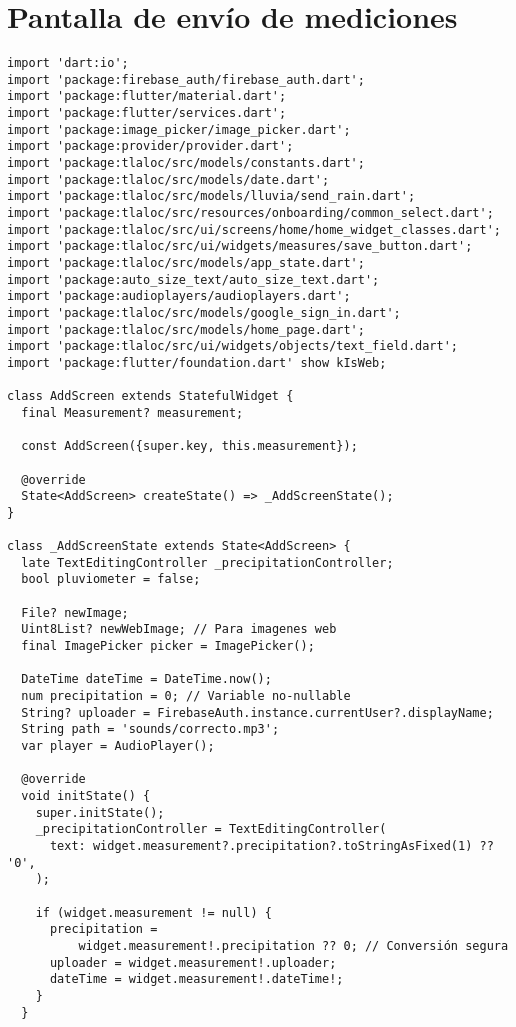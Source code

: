 




\section{Pantalla de envío de mediciones}
\label{anexo:alg13}
\begin{verbatim} 
import 'dart:io';
import 'package:firebase_auth/firebase_auth.dart';
import 'package:flutter/material.dart';
import 'package:flutter/services.dart';
import 'package:image_picker/image_picker.dart';
import 'package:provider/provider.dart';
import 'package:tlaloc/src/models/constants.dart';
import 'package:tlaloc/src/models/date.dart';
import 'package:tlaloc/src/models/lluvia/send_rain.dart';
import 'package:tlaloc/src/resources/onboarding/common_select.dart';
import 'package:tlaloc/src/ui/screens/home/home_widget_classes.dart';
import 'package:tlaloc/src/ui/widgets/measures/save_button.dart';
import 'package:tlaloc/src/models/app_state.dart';
import 'package:auto_size_text/auto_size_text.dart';
import 'package:audioplayers/audioplayers.dart';
import 'package:tlaloc/src/models/google_sign_in.dart';
import 'package:tlaloc/src/models/home_page.dart';
import 'package:tlaloc/src/ui/widgets/objects/text_field.dart';
import 'package:flutter/foundation.dart' show kIsWeb;

class AddScreen extends StatefulWidget {
  final Measurement? measurement;

  const AddScreen({super.key, this.measurement});

  @override
  State<AddScreen> createState() => _AddScreenState();
}

class _AddScreenState extends State<AddScreen> {
  late TextEditingController _precipitationController;
  bool pluviometer = false;

  File? newImage;
  Uint8List? newWebImage; // Para imagenes web
  final ImagePicker picker = ImagePicker();

  DateTime dateTime = DateTime.now();
  num precipitation = 0; // Variable no-nullable
  String? uploader = FirebaseAuth.instance.currentUser?.displayName;
  String path = 'sounds/correcto.mp3';
  var player = AudioPlayer();

  @override
  void initState() {
    super.initState();
    _precipitationController = TextEditingController(
      text: widget.measurement?.precipitation?.toStringAsFixed(1) ?? '0',
    );

    if (widget.measurement != null) {
      precipitation =
          widget.measurement!.precipitation ?? 0; // Conversión segura
      uploader = widget.measurement!.uploader;
      dateTime = widget.measurement!.dateTime!;
    }
  }


\end{verbatim}
